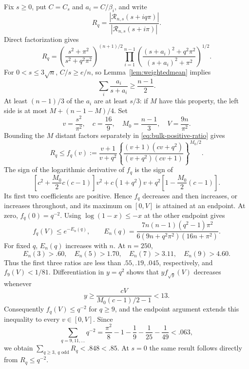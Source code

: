 Fix $s\ge0$, put $C=C_s$ and $a_i=C/\beta_i$, and write
\[
 R_q=\frac{|\mathcal R_{n,s}(s+iq\pi)|}
 {|\mathcal R_{n,s}(s+i\pi)|}.
\]
Direct factorization gives
\begin{equation}\label{eq:bulk-positive-ratio}
 R_q=\left(\frac{s^2+\pi^2}{s^2+q^2\pi^2}\right)^{(n+1)/2}
 \prod_{i=1}^{n-1}
 \left(\frac{(s+a_i)^2+q^2\pi^2}{(s+a_i)^2+\pi^2}\right)^{1/2}.
\end{equation}
For $0<s\le3\sqrt n$, $C/s\ge e/n$, so Lemma~\ref{lem:weightedmean}
implies
\[
 \sum_i\frac{a_i}{s+a_i}\ge\frac{n-1}{2}.
\]
At least $(n-1)/3$ of the $a_i$ are at least $s/3$: if $M$ have this
property, the left side is at most $M+(n-1-M)/4$.
Set
\[
 v=\frac{s^2}{\pi^2},\quad c=\frac{16}{9},\quad
 M_0=\frac{n-1}{3},\quad V=\frac{9n}{\pi^2}.
\]
Bounding the $M$ distant factors separately in
\eqref{eq:bulk-positive-ratio} gives
\begin{equation}\label{eq:positive-fq}
 R_q\le f_q(v):=\frac{v+1}{v+q^2}
 \left\{\frac{(v+1)(cv+q^2)}{(v+q^2)(cv+1)}\right\}^{M_0/2}.
\end{equation}
The sign of the logarithmic derivative of $f_q$ is the sign of
\[
 \left[c^2+\frac{M_0}{2}c(c-1)\right]v^2
 +c(1+q^2)v+q^2\left[1-\frac{M_0}{2}(c-1)\right].
\]
Its first two coefficients are positive. Hence $f_q$ decreases and
then increases, or increases throughout, and its maximum on $[0,V]$
is attained at an endpoint. At zero, $f_q(0)=q^{-2}$. Using
$\log(1-x)\le-x$ at the other endpoint gives
\[
 f_q(V)\le e^{-E_n(q)},\qquad
 E_n(q)=\frac{7n(n-1)(q^2-1)\pi^2}
 {6(9n+q^2\pi^2)(16n+\pi^2)}.
\]
For fixed $q$, $E_n(q)$ increases with $n$. At $n=250$,
\[
 E_n(3)>.60,\quad E_n(5)>1.70,\quad
 E_n(7)>3.11,\quad E_n(9)>4.60.
\]
Thus the first three ratios are less than $.55,.19,.045$, respectively,
and $f_9(V)<1/81$. Differentiation in $y=q^2$ shows that
$yf_{\sqrt y}(V)$ decreases whenever
\[
 y\ge\frac{cV}{M_0(c-1)/2-1}<13.
\]
Consequently $f_q(V)\le q^{-2}$ for $q\ge9$, and the endpoint argument
extends this inequality to every $v\in[0,V]$. Since
\[
 \sum_{q=9,11,\ldots}q^{-2}
 =\frac{\pi^2}{8}-1-\frac19-\frac1{25}-\frac1{49}<.063,
\]
we obtain $\sum_{q\ge3,\ q\text{ odd}}R_q<.848<.85$. At $s=0$ the
same result follows directly from $R_q\le q^{-2}$.

